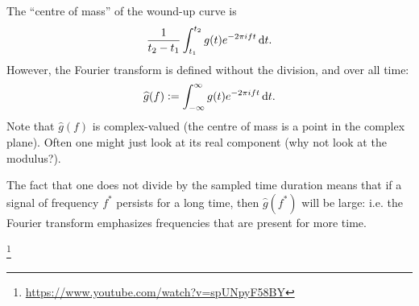 The ``centre of mass'' of the wound-up curve is
\begin{align*}
  \frac{1}{t_2 - t_1} \int_{t_1}^{t_2} g(t)e^{-2\pi i f t} \dt.
\end{align*}
However, the Fourier transform is defined without the division, and over all time:
\begin{align*}
  \hat{g}(f) := \int_{-\infty}^{\infty} g(t)e^{-2\pi i f t} \dt.
\end{align*}
Note that $\hat{g}(f)$ is complex-valued (the centre of mass is a point in the complex plane). Often one might
just look at its real component (why not look at the modulus?).

The fact that one does not divide by the sampled time duration means that if a signal of frequency $f^*$
persists for a long time, then $\hat{g}(f^*)$ will be large: i.e. the Fourier transform emphasizes frequencies
that are present for more time.

\footnote{\url{https://www.youtube.com/watch?v=spUNpyF58BY}}
